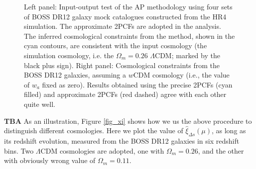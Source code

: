 \documentclass[iop]{emulateapj}
\begin{document}
\begin{figure}
   \caption{\label{fig_Check}
 Left panel: Input-output test of the AP methodology using four sets of BOSS DR12 galaxy mock catalogues constructed from the HR4 simulation.
 The approximate 2PCFs are adopted in the analysis.
 The inferred cosmological constraints from the method, shown in the cyan contours, are consistent with the input cosmology
 (the simulation cosmology, i.e. the $\Omega_m=0.26$ $\Lambda$CDM; marked by the black plus sign).
 Right panel: Cosmological constraints from the BOSS DR12 galaxies, assuming a $w$CDM cosmology 
 (i.e., the value of $w_a$ fixed as zero).
 Results obtained using the precise 2PCFs (cyan filled) 
 and approximate 2PCFs (red dashed) agree with each other quite well.
   }
\end{figure}

{\bf TBA}
As an illustration,
Figure \ref{fig_xi} shows how we us the above procedure to distinguish different cosmologies.
Here we plot the value of $\hat\xi_{\Delta s}(\mu)$, as long as its redshift evolution, 
measured from the BOSS DR12 galaxies in six redshift bins.
Two $\Lambda$CDM cosmologies are adopted, 
one with $\Omega_m=0.26$, and the other with obviously wrong value of $\Omega_m=0.11$.
\end{document}
